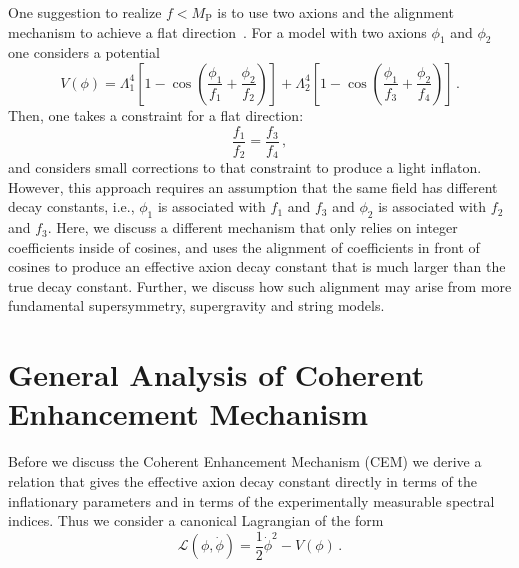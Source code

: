 \documentclass[12pt]{article}
\begin{document}
One suggestion to realize $f < M_\text{P}$ is to use two axions and the alignment mechanism to achieve a flat direction~\cite{Long:2014dta}.
For a model with two axions $\phi_1$ and $\phi_2$ one considers a potential
\begin{equation} \label{eq:alignmentPotential}
  V(\phi)
    = \Lambda^4_1 \left[1 - \cos\left(\frac{\phi_1}{f_1} + \frac{\phi_2}{f_2}\right)\right]
    + \Lambda^4_2 \left[1 - \cos\left(\frac{\phi_1}{f_3} + \frac{\phi_2}{f_4}\right)\right]\,.
\end{equation}
Then, one takes a constraint for a flat direction:
\begin{equation}
  \frac{f_1}{f_2} = \frac{f_3}{f_4}\,,
\end{equation}
and considers small corrections to that constraint to produce a light inflaton.
However, this approach requires an assumption that the same field has different decay constants, i.e., $\phi_1$ is associated with $f_1$ and $f_3$ and $\phi_2$ is associated with $f_2$ and $f_3$.
Here, we discuss a different mechanism that only relies on integer coefficients inside of cosines, and uses the alignment of coefficients in front of cosines to produce an effective axion decay constant that is much larger than the true decay constant.
Further, we discuss how such alignment may arise from more fundamental supersymmetry, supergravity and string models.

\section{General Analysis of Coherent Enhancement Mechanism \label{sec:CoherentEnhancement}}
Before we discuss the Coherent Enhancement Mechanism (CEM) we derive a relation that gives the effective axion decay constant directly in terms of the inflationary parameters and in terms of the experimentally measurable spectral indices.
Thus we consider a canonical Lagrangian of the form
\begin{equation}
  \mathcal{L}\left(\phi, \dot{\phi}\right) = \frac{1}{2}{\dot{\phi}}^2 - V\left(\phi\right)\,.
\end{equation}
\end{document}
